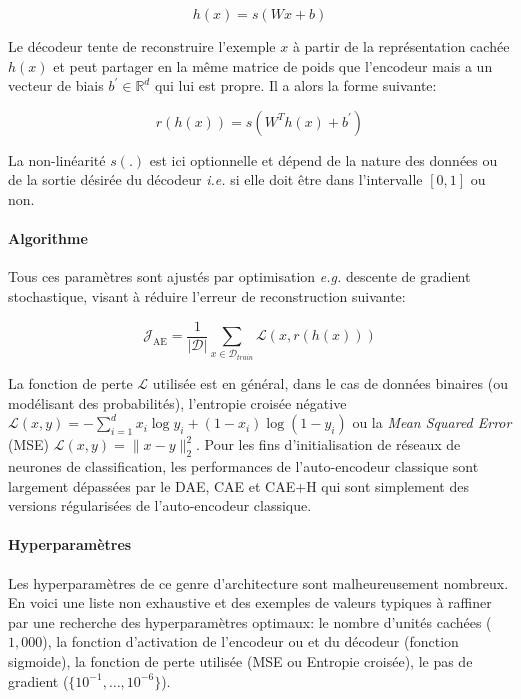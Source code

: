 \begin{equation}
h(x)=s(Wx+b)
\end{equation}

Le décodeur tente de reconstruire l'exemple $x$ à partir de la représentation
cachée $h(x)$ et peut partager en la m\^eme matrice de poids que l'encodeur
mais a un vecteur de biais $b^{'}\in\mathbb{R}^d$ qui lui est propre. Il a
alors la forme suivante:

\begin{equation}
r(h(x))=s(W^{T} h(x)+b^{'}) \label{eq:autoenc}
\end{equation} 

La non-linéarité $s(.)$ est ici optionnelle et dépend de la nature des données
ou de la sortie désirée du décodeur \textit{i.e.} si elle doit \^etre dans
l'intervalle $[0,1]$ ou non.  \\

\paragraph{Algorithme}
Tous ces paramètres sont ajustés par optimisation \textit{e.g.} descente de
gradient stochastique, visant à réduire l'erreur de reconstruction suivante:

\begin{equation}
\mathcal{J}_{\textrm{AE}} = \frac{1}{\vert \mathcal{D}\vert}\sum_{x\in\mathcal{D}_{train}}\mathcal{L}(x,r(h(x)))
\label{eq:ae}
\end{equation}

La fonction de perte $\mathcal{L}$ utilisée est en général, dans le cas de
données binaires (ou modélisant des probabilités), l'entropie croisée négative
$\mathcal{L}(x,y) = -\sum_{i=1}^d x_i\log y_i + (1-x_i)\log(1-y_i)$ ou la
\textit{Mean Squared Error} (MSE) $\mathcal{L}(x,y) = \| x-y\|^2_2$. Pour les
fins d'initialisation de réseaux de neurones de classification, les
performances de l'auto-encodeur classique sont largement dépassées par le DAE,
CAE et CAE+H qui sont simplement des versions régularisées de l'auto-encodeur
classique.

\paragraph{Hyperparamètres} Les hyperparamètres de ce genre d'architecture sont
malheureusement nombreux. En voici une liste non exhaustive et des exemples de
valeurs typiques à raffiner par une recherche des hyperparamètres optimaux: le
nombre d'unités cachées ($1,000$), la fonction d'activation de l'encodeur ou et
du décodeur (fonction sigmoide), la fonction de perte utilisée (MSE ou Entropie
croisée), le pas de gradient ($\lbrace 10^{-1},\dots,10^{-6}\rbrace$).  \\

